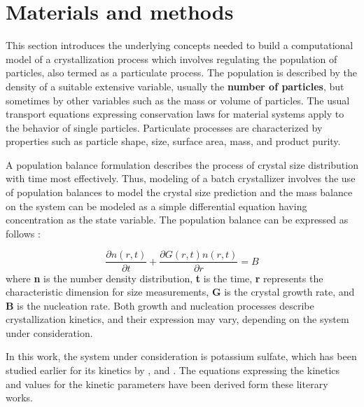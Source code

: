 \documentclass[3p,times,authoryear]{elsarticle}
\begin{document}
\section{Materials and methods} \label{model}


This section introduces the underlying concepts needed to build a computational model of a crystallization process which involves regulating the population of particles, also termed as a particulate process. 
The population is described by the density of a suitable extensive variable, usually the \textbf{number of particles}, but sometimes by other variables such as the mass or volume of particles. The usual transport equations expressing conservation laws for material systems apply to the behavior of single particles. Particulate processes are characterized by properties such as particle shape, size, surface area, mass, and product purity. \par
A population balance formulation describes the process of crystal size distribution with time most effectively. Thus, modeling of a batch crystallizer involves the use of population balances to model the crystal size prediction and the mass balance on the system can be modeled as a simple differential equation having concentration as the state variable.
The population balance can be expressed as follows :

\begin{equation} \label{populationbalance}
\frac{\partial{n(r,t)}}{\partial{t}} + \frac{\partial{G(r,t)n(r,t)}}{\partial{r}} = B  
\end{equation}
where \textbf{n} is the number density distribution, \textbf{t} is the time, \textbf{r} represents the characteristic dimension for size measurements, \textbf{G} is the crystal growth rate, and \textbf{B} is the nucleation rate. Both growth and nucleation processes describe crystallization kinetics, and their expression may vary, depending on the system under consideration.

In this work, the system under consideration is potassium sulfate, which has been studied earlier for its kinetics by \cite{hu}, \cite{shi} and \cite{paeng}. The equations expressing the kinetics and values for the kinetic parameters have been derived form these literary works. 
\end{document}

